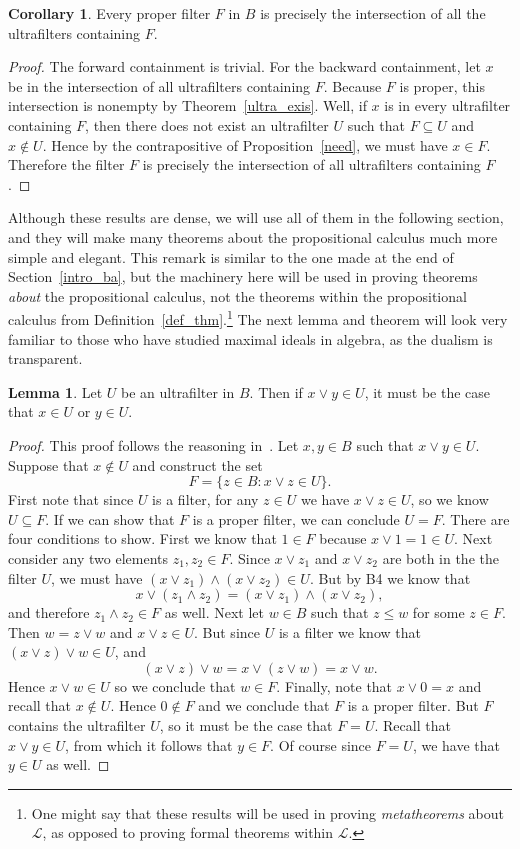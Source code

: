 \documentclass[11pt,titlepage]{article}
\newcommand{\Lan}{\mathcal{L}}
\theoremstyle{definition}
\newtheorem{lemma}[definition]{Lemma}
\newtheorem{corollary}[definition]{Corollary}
\begin{document}
\begin{corollary}\label{int.ult} Every proper filter $F$ in $B$ is precisely the intersection of all the ultrafilters containing $F$.
\end{corollary}
\begin{proof} The forward containment is trivial. For the backward containment, let $x$ be in the intersection of all ultrafilters containing $F$. Because $F$ is proper, this intersection is nonempty by Theorem~\ref{ultra_exis}. Well, if $x$ is in every ultrafilter containing $F$, then there does not exist an ultrafilter $U$ such that $F\subseteq U$ and $x\notin U$. Hence by the contrapositive of Proposition~\ref{need}, we must have $x\in F$. Therefore the filter $F$ is precisely the intersection of all ultrafilters containing $F$.\end{proof}

Although these results are dense, we will use all of them in the following section, and they will make many theorems about the propositional calculus much more simple and elegant. This remark is similar to the one made at the end of Section~\ref{intro_ba}, but the machinery here will be used in proving theorems {\em about} the propositional calculus, not the theorems within the propositional calculus from Definition~\ref{def_thm}.\footnote{One might say that these results will be used in proving {\em metatheorems} about $\Lan$, as opposed to proving formal theorems within $\Lan$.} The next lemma and theorem will look very familiar to those who have studied maximal ideals in algebra, as the dualism is transparent.

\begin{lemma}\label{prime} Let $U$ be an ultrafilter in $B$. Then if $x\lor y\in U$, it must be the case that $x\in U$ or $y\in U$. 
\end{lemma}
\begin{proof} This proof follows the reasoning in~\cite{Bell}. Let $x,y\in B$ such that $x\lor y\in U$. Suppose that $x\notin U$ and construct the set $$F=\{z\in B : x\lor z \in U\}.$$ First note that since $U$ is a filter, for any $z\in U$ we have $x\lor z \in U$, so we know $U\subseteq F$. If we can show that $F$ is a proper filter, we can conclude $U=F$. There are four conditions to show. First we know that $1\in F$ because $x\lor 1=1\in U$. Next consider any two elements $z_1,z_2\in F$. Since $x\lor z_1$ and $x\lor z_2$ are both in the the filter $U$, we must have $(x\lor z_1) \land (x\lor z_2) \in U$. But by B4 we know that $$x\lor (z_1\land z_2) = (x\lor z_1) \land (x\lor z_2),$$ and therefore $z_1\land z_2 \in F$ as well. Next let $w\in B$ such that $z\le w$ for some $z\in F$. Then $w=z\lor w$ and $x\lor z \in U$. But since $U$ is a filter we know that $(x\lor z) \lor w \in U$, and $$(x\lor z) \lor w = x\lor (z\lor w) = x\lor w.$$ Hence $x\lor w \in U$ so we conclude that $w\in F$. Finally, note that $x\lor 0 = x$ and recall that $x\notin U$. Hence $0\notin F$ and we conclude that $F$ is a proper filter. But $F$ contains the ultrafilter $U$, so it must be the case that $F=U$. Recall that $x\lor y\in U$, from which it follows that $y\in F$. Of course since $F=U$, we have that $y\in U$ as well.
\end{proof}
\end{document}
